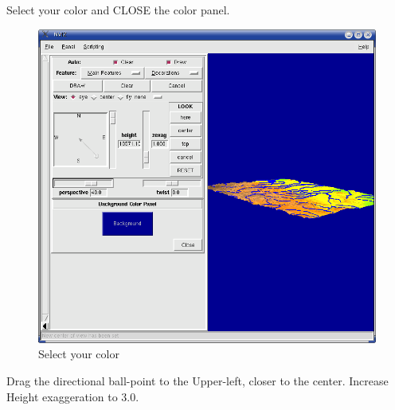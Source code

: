 Select your color and CLOSE the color panel.

\begin{figure}[htbp]
   \centering
   \includegraphics[scale=0.2]{nviz011.png}
   \caption{Select your color}
   \label{fig:nviz011}
\end{figure}

Drag the directional ball-point to the Upper-left, closer to the center. Increase Height exaggeration to 3.0.

